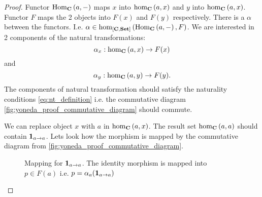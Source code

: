 \begin{lemma}[Yoneda]
\begin{proof}
Functor
$\mathrm{Hom}_{\mathbf{C}}\left(a, -\right)$ maps $x$ into $\catmset[C]{a}{x}$ and $y$ into 
$\catmset[C]{a}{x}$. Functor $F$ maps the 2 objects into $F(x)$ and
$F(y)$ respectively. There is a  $\alpha$ between
the functors. I.e.  $\alpha \in
\catmset[\funcat{C}{Set}]{\catcovhom{C}{a}}{F}$. We are interested in
2 components of the natural transformations:
\[
\alpha_x : \catmset[C]{a}{x} \to F(x)
\]
and
\[
\alpha_y : \catmset[C]{a}{y} \to F(y).
\]
The components of natural transformation should satisfy the naturality
conditions \eqref{eq:nt_definition} i.e. the commutative diagram
\cref{fig:yoneda_proof_commutative_diagram} should commute.

We can replace object $x$ with $a$ in $\catmset[C]{a}{x}$. The result
set $\catmset[C]{a}{a}$ should contain  $\mathbf{1}_{ a \to a }$.
Lets look how the morphism is mapped by the commutative diagram from
\cref{fig:yoneda_proof_commutative_diagram}.

\begin{figure}
  \centering
  \caption{Mapping for $\mathbf{1}_{ a \to a }$. The identity morphism is mapped into
    $p \in F(a)$ i.e. $p = \alpha_a(\mathbf{1}_{ a \to a })$}
  \label{fig:yoneda_proof_idm}
\end{figure}


\end{proof}
\end{lemma}
